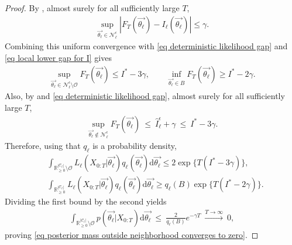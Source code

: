 \documentclass[pdflatex,sn-mathphys-num]{sn-jnl}%
\def\dd{\text{d}}
\theoremstyle{thmstyleone}%
\theoremstyle{thmstyletwo}%
\theoremstyle{thmstylethree}%
\begin{document}
\begin{appendices}
\begin{proof}
    By , almost surely for all sufficiently large $T$,
    \begin{align*}
        \sup_{\overrightarrow{\theta_\ell}\in\mathcal N_\ell^\epsilon}
        \left|F_T\left(\overrightarrow{\theta_\ell}\right)-I_\ell\left(\overrightarrow{\theta_\ell}\right)\right|
        \leq \gamma .
    \end{align*}
    Combining this uniform convergence with \eqref{eq deterministic likelihood gap} and \eqref{eq local lower gap for I} gives
    \begin{align*}
        \sup_{\overrightarrow{\theta_\ell}\in\mathcal N_\ell^\epsilon\setminus\mathcal O}
        F_T\left(\overrightarrow{\theta_\ell}\right)
        \leq I^*-3\gamma,
        \qquad
        \inf_{\overrightarrow{\theta_\ell}\in B}
        F_T\left(\overrightarrow{\theta_\ell}\right)
        \geq I^*-2\gamma .
    \end{align*}
    Also, by  and \eqref{eq deterministic likelihood gap}, almost surely for all sufficiently large $T$,
    \begin{align*}
        \sup_{\overrightarrow{\theta_\ell}\notin\mathcal N_\ell^\epsilon}
        F_T\left(\overrightarrow{\theta_\ell}\right)
        ~\leq~ \hat I_\ell^\epsilon + \gamma ~\leq~ I^*-3\gamma .
    \end{align*}
    Therefore, using that $q_\ell$ is a probability density,
    \begin{align*}
        &\int_{\mathbb R_{\geq0}^{|\mathcal C_\ell|}\setminus\mathcal O}
        L_\ell\left(X_{0:T}\big|\overrightarrow{\theta_\ell}\right)
        q_\ell\left(\overrightarrow{\theta_\ell}\right)
        \dd\overrightarrow{\theta_\ell}
        \leq 2\exp\{T(I^*-3\gamma)\},\\
        &\int_{\mathbb R_{\geq0}^{|\mathcal C_\ell|}}
        L_\ell\left(X_{0:T}\big|\overrightarrow{\theta_\ell}\right)
        q_\ell\left(\overrightarrow{\theta_\ell}\right)
        \dd\overrightarrow{\theta_\ell}
        \geq q_\ell(B)\exp\{T(I^*-2\gamma)\}.
    \end{align*}
    Dividing the first bound by the second yields
    \begin{align*}
        \int_{\mathbb R_{\geq0}^{|\mathcal C_\ell|}\setminus\mathcal O}
        p\left(\overrightarrow{\theta_\ell}\big|X_{0:T}\right)
        \dd\overrightarrow{\theta_\ell}
        ~\leq~
        \frac{2}{q_\ell(B)}e^{-\gamma T}
        ~\xrightarrow[]{T\to\infty}~0,
    \end{align*}
    proving \eqref{eq posterior mass outside neighborhood converges to zero}.
\end{proof}


\end{appendices}
\end{document}
